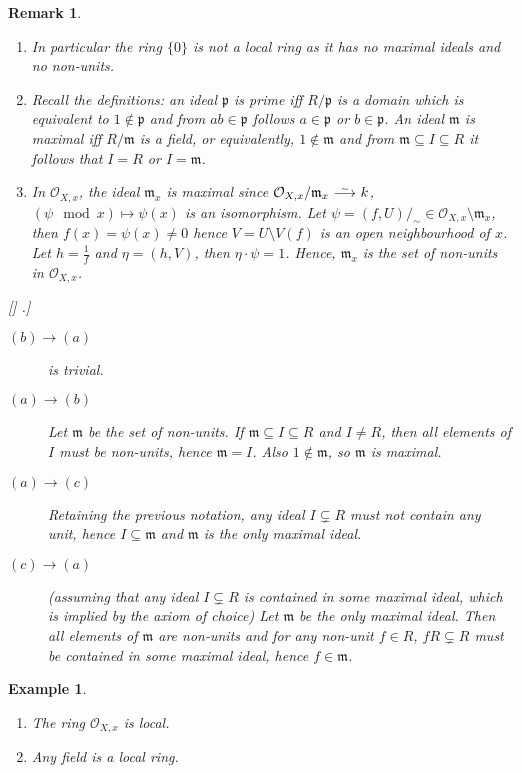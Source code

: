 \documentclass[DIV=14,parskip=full,pointednumbers]{scrartcl}
\newenvironment{alphanumerate}{\begin{enumerate}[label={$(\alph*)$},ref=\curthm]}{\end{enumerate}}
\theoremstyle{cthm}
\theoremstyle{cvarthm}
\renewenvironment{proof}[1][\proofname]
{\pushQED{\qed}\topsep0pt \partopsep0pt\trivlist\item[\hskip\labelsep\itshape #1.] }{\popQED\endtrivlist\addvspace{6pt plus 6pt}}
\theoremstyle{cdef}
\newtheorem{example}{Example}[subsection]
\newtheorem{rem}{Remark}[subsection]
\newcommand{\reff}[1]{%
	\edef\pretemp{\getrefnumber{#1}}%
	\StrLeft{\pretemp}{1}[\dummy]%
	\IfInteger{\dummy}{\def\temp{\pretemp}}{\def\temp{\detokenize\pretemp}}%
	\StrBehind{\temp}{\thesubsection.}[\tempcropped]%
	\IfBeginWith{\temp}{\thesubsection}{\hyperref[#1]{\tempcropped}} {\hyperref[#1]{\temp}}%
}
\newcommand{\Oo}{\mathcal{O}}
\newcommand{\mm}{\mathfrak{m}}
\newcommand{\pp}{\mathfrak{p}}
\newcommand{\isomorphism}{
	\tikz[baseline=(a.base)] \node (a) at (0,0) {$\longrightarrow$} node[above=-0.25ex] {\tiny $\sim$};}
\begin{document}
	\begin{rem}
	\begin{alphanumerate}
	\item 
		In particular the ring $\{0\}$ is not a local ring as it has no maximal ideals and no non-units.
	\item 
		Recall the definitions: an ideal $\pp$ is prime iff $R/\pp$ is a domain which is equivalent to $1\not\in \pp$ and from $ab\in \pp$ follows $a\in \pp$ or $b\in \pp$. An ideal $\mm$ is maximal iff $R/\mm$ is a field, or equivalently, $1\not\in \mm$ and from $\mm\subseteq I\subseteq R$ it follows that $I=R$ or $I=\mm$.
	\item
		 In $\Oo_{X,x}$, the ideal $\mm_x$ is maximal since $\Oo_{X,x}/\mm_x \isomorphism k$, $(\psi\mod x)\mapsto \psi(x)$ is an isomorphism. Let $\psi = (f,U)/_\sim\in \Oo_{X,x}\setminus \mm_x$, then $f(x) = \psi(x) \neq 0$ hence $V=U\setminus V(f)$ is an open neighbourhood of $x$. Let $h=\frac{1}{f}$ and $\eta = (h, V)$, then $\eta\cdot \psi = 1$. Hence, $\mm_x$ is the set of non-units in $\Oo_{X,x}$.
	\end{alphanumerate}
	\begin{proof}[Proof of equivalence in Definition~\reff{def:localring}]
		\begin{description}
			\item[$(b)\to (a)$] is trivial.
		
			\item[$(a)\to (b)$] Let $\mm$ be the set of non-units. If $\mm\subseteq I\subseteq R$ and $I\neq R$, then all elements of $I$ must be non-units, hence $\mm = I$. Also $1\not\in \mm$, so $\mm$ is maximal.
			
			\item[$(a)\to (c)$] Retaining the previous notation, any ideal $I\subsetneq R$ must not contain any unit, hence $I\subseteq \mm$ and $\mm$ is the only maximal ideal.
			
			\item[$(c) \to (a)$] (assuming that any ideal $I\subsetneq R$ is contained in some maximal ideal, which is implied by the axiom of choice) Let $\mm$ be the only maximal ideal. Then all elements of $\mm$ are non-units and for any non-unit $f\in R$, $fR\subsetneq R$ must be contained in some maximal ideal, hence $f\in\mm$.
	\end{description}
	\end{proof}
	\end{rem}
	\begin{example}
		\begin{alphanumerate}
		\item 
			The ring $\Oo_{X,x}$ is local.
		\item 
			Any field is a local ring.
		\end{alphanumerate}

	\end{example}
\end{document}
